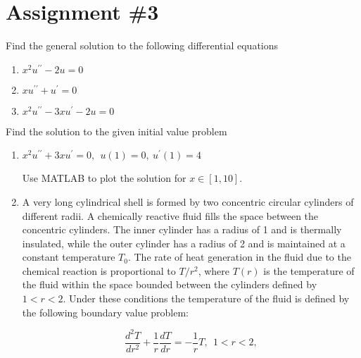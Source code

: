 \chapter{Assignment \#3}
\label{ch:ass3}
\begin{fullwidth}
Find the general solution to the following differential equations
\begin{enumerate}
\item $x^2 u^{\prime \prime} - 2u = 0$

\vspace{1.0cm}

\item $xu^{\prime \prime} + u^{\prime} = 0$

\vspace{1.0cm}

\item $x^2 u^{\prime \prime} - 3xu^{\prime}-2u =0$

\vspace{1.0cm}

\end{enumerate}

Find the solution to the given initial value problem

\begin{enumerate}[resume]
\item $x^2u^{\prime \prime}+3xu^{\prime} = 0, \ \ u(1) = 0, \ u^{\prime}(1)=4$

Use MATLAB to plot the solution for $x\in[1,10]$.

\vspace{1.0cm}

\item A very long cylindrical shell is formed by two concentric circular cylinders of different radii.  A chemically reactive fluid fills the space between the concentric cylinders.  The inner cylinder has a radius of 1 and is thermally insulated, while the outer cylinder has a radius of 2 and is maintained at a constant temperature $T_0$.  The rate of heat generation in the fluid due to the chemical reaction is proportional to $T/r^2$, where $T(r)$ is the temperature of the fluid within the space bounded between the cylinders defined by $1<r<2$.  Under these conditions the temperature of the fluid is defined by the following boundary value problem:

\begin{equation*}
\frac{d^2T}{dr^2}+\frac{1}{r}\frac{dT}{dr}=-\frac{1}{r}T, \ \ 1 < r < 2, 
\end{equation*}


\end{enumerate}
\end{fullwidth}

